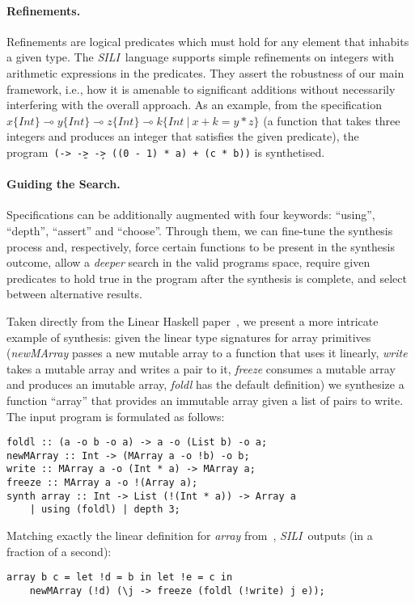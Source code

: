 \documentclass{llncs}
\newcommand{\lolli}{\multimap}
\newcommand{\synname}{\emph{SILI}}
\begin{document}
\paragraph{Refinements.} Refinements are logical predicates
which must hold for any element that inhabits a given type. The \synname\
language supports simple refinements on integers with arithmetic
expressions in the predicates. They assert the robustness of our main
framework, i.e., how it is amenable to significant additions without
necessarily interfering with the overall approach.
%
As an example, from the specification $x \{Int\} \lolli y \{Int\} \lolli z
\{Int\} \lolli k \{Int\ \vert\ x + k = y * z\}$ (a function that takes three
integers and produces an integer that satisfies the given predicate), the
program\ \texttt{(\a -> \b -> \c -> ((0 - 1) * a) + (c * b))} is
synthetised.

\paragraph{Guiding the Search.} Specifications can be additionally
augmented with four keywords: ``using'', ``depth'', ``assert'' and ``choose''.
Through them, we can fine-tune the synthesis process and,
respectively, force certain functions to be present in the synthesis
outcome, allow a \emph{deeper} search in the valid programs space,
require given predicates to hold true in the program after the
synthesis is complete, and select between alternative results.

Taken directly from the Linear Haskell paper~\cite{Bernardy_2018}, we present a
more intricate example of synthesis: given the linear type signatures for array
primitives (\emph{newMArray} passes a new mutable array to a function that uses
it linearly, \emph{write} takes a mutable array and writes a pair to it,
\emph{freeze} consumes a mutable array and produces an imutable array,
\emph{foldl} has the default definition) we synthesize a function
``array'' that provides an immutable array given a list of pairs to write. The input program is formulated as
follows:
%
\begin{verbatim}
foldl :: (a -o b -o a) -> a -o (List b) -o a;
newMArray :: Int -> (MArray a -o !b) -o b;
write :: MArray a -o (Int * a) -> MArray a;
freeze :: MArray a -o !(Array a);
synth array :: Int -> List (!(Int * a)) -> Array a
    | using (foldl) | depth 3;
\end{verbatim}
%
Matching exactly the linear definition for
\emph{array} from~\cite{Bernardy_2018}, \synname\
outputs (in a fraction of a second):
%
\begin{verbatim}
array b c = let !d = b in let !e = c in
    newMArray (!d) (\j -> freeze (foldl (!write) j e));
\end{verbatim}
\end{document}
